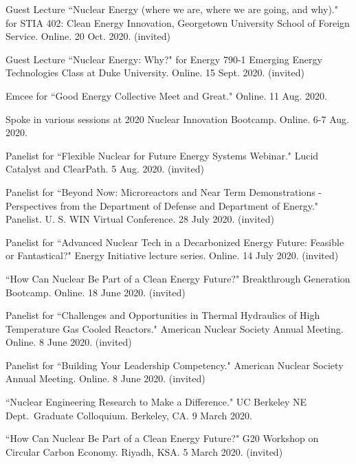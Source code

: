 \begin{bibsection}
\item Guest Lecture ``Nuclear Energy (where we are, where we are going, and why)." for STIA 402: Clean Energy Innovation, Georgetown University School of Foreign Service. Online. 20 Oct. 2020. (invited)

\item Guest Lecture ``Nuclear Energy: Why?" for Energy 790-1 Emerging Energy Technologies Class at Duke University. Online. 15 Sept. 2020. (invited)

\item Emcee for ``Good Energy Collective Meet and Great." Online. 11 Aug. 2020.

\item Spoke in various sessions at 2020 Nuclear Innovation Bootcamp. Online. 6-7 Aug. 2020.

\item Panelist for ``Flexible Nuclear for Future Energy Systems Webinar." Lucid Catalyst and ClearPath. 5 Aug. 2020. (invited)

\item Panelist for ``Beyond Now: Microreactors and Near Term Demonstrations - Perspectives from the Department of Defense and Department of Energy." Panelist. U. S. WIN Virtual Conference. 28 July 2020. (invited)

\item Panelist for ``Advanced Nuclear Tech in a Decarbonized Energy Future: Feasible or Fantastical?" 
Energy Initiative lecture series. Online. 14 July 2020. (invited)

\item ``How Can Nuclear Be Part of a Clean Energy Future?"
Breakthrough Generation Bootcamp. Online. 18 June 2020. (invited)

\item Panelist for ``Challenges and Opportunities in Thermal
Hydraulics of High Temperature Gas Cooled Reactors." American Nuclear Society Annual Meeting. Online. 8 June 2020. (invited)

\item Panelist for ``Building Your Leadership Competency."
American Nuclear Society Annual Meeting. Online. 8 June 2020. (invited)

\item ``Nuclear Engineering Research to Make a Difference." UC
Berkeley NE Dept.\ Graduate Colloquium. Berkeley, CA. 9 March 2020.

\item ``How Can Nuclear Be Part of a Clean Energy Future?" G20
Workshop on Circular Carbon Economy. Riyadh, KSA. 5 March 2020. (invited)


\end{bibsection}
